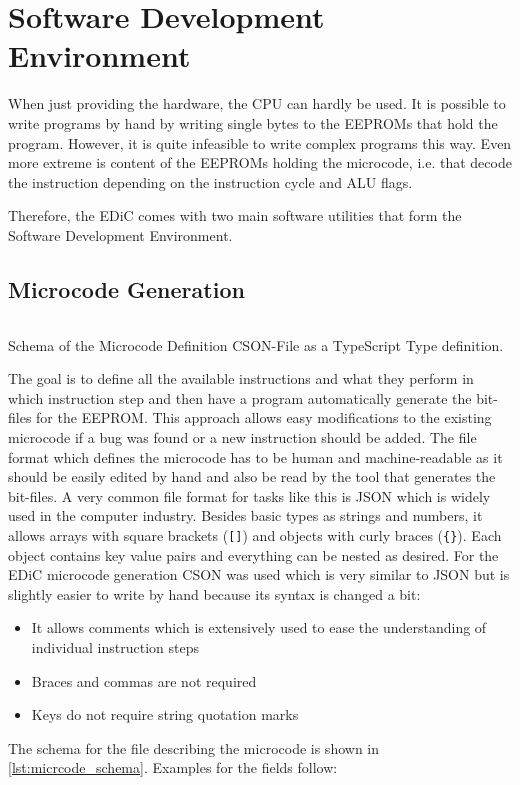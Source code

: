 \chapter{Software Development Environment}\label{cha:software}
When just providing the hardware, the \gls{CPU} can hardly be used.
It is possible to write programs by hand by writing single bytes to the \glspl{EEPROM} that hold the program.
However, it is quite infeasible to write complex programs this way.
Even more extreme is content of the \glspl{EEPROM} holding the microcode, i.e. that decode the instruction depending on the instruction cycle and \gls{ALU} flags.

Therefore, the \gls{EDiC} comes with two main software utilities that form the Software Development Environment.

\section{Microcode Generation}\label{sec:microcode}
\begin{listing}[t]
  \inputminted[linenos,
    breaklines,
    frame=leftline,
    xleftmargin=20pt,
  ]{TypeScript}{src/microcode.ts}
  \caption{Schema of the Microcode Definition CSON-File \cite{CSON} as a TypeScript \cite{TS} Type definition.}
  \label{lst:micrcode_schema}
\end{listing}
The goal is to define all the available instructions and what they perform in which instruction step and then have a program automatically generate the bit-files for the \gls{EEPROM}.
This approach allows easy modifications to the existing microcode if a bug was found or a new instruction should be added.
The file format which defines the microcode has to be human and machine-readable as it should be easily edited by hand and also be read by the tool that generates the bit-files.
A very common file format for tasks like this is \gls{JSON} \cite{JSON} which is widely used in the computer industry.
Besides basic types as strings and numbers, it allows arrays with square brackets (\texttt{[]}) and objects with curly braces (\texttt{\{\}}).
Each object contains key value pairs and everything can be nested as desired.
For the \gls{EDiC} microcode generation \gls{CSON} was used which is very similar to \gls{JSON} but is slightly easier to write by hand because its syntax is changed a bit:
\begin{itemize}
  \item It allows comments which is extensively used to ease the understanding of individual instruction steps
  \item Braces and commas are not required
  \item Keys do not require string quotation marks
\end{itemize}
The schema for the file describing the microcode is shown in \cref{lst:micrcode_schema}.
Examples for the fields follow:

